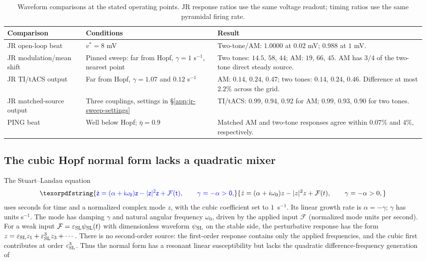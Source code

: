 \documentclass[11pt,a4paper]{article}
\newif\ifsupp
\providecommand{\DIFaddtex}[1]{{\protect\color{blue} \sf #1}} %
\providecommand{\DIFadd}[1]{\texorpdfstring{\DIFaddtex{#1}}{#1}} %
\begin{document}
\begin{table}[htbp]
\color{blue}\centering\small
\caption{\color{blue}Waveform comparisons at the stated operating points. JR response ratios
use the same voltage readout; timing ratios use the same pyramidal firing rate.}
\label{tab:waveform-checks}
\begin{tabular}{@{}p{4.3cm}p{4.5cm}p{6cm}@{}}
\toprule
Comparison & Conditions & Result\\
\midrule
JR open-loop beat & $v^*=8$ mV & Two-tone/AM: $1.0000$ at $0.02$ mV; $0.988$ at $1$ mV.\\
JR modulation/mean shift & Pinned sweep: far from Hopf, $\gamma=1$ s$^{-1}$, nearest point & Two tones: $14.5$, $58$, $44$; AM: $19$, $66$, $45$. AM has $3/4$ of the two-tone direct steady source.\\
JR TI/tACS output & Far from Hopf, $\gamma=1.07$ and $0.12$ s$^{-1}$ & AM: $0.14$, $0.24$, $0.47$; two tones: $0.14$, $0.24$, $0.46$. Difference at most $2.2\%$ across the grid.\\
JR matched-source output & Three couplings, settings in \S\ref{app:jr-sweep-settings} & TI/tACS: $0.99$, $0.94$, $0.92$ for AM; $0.99$, $0.93$, $0.90$ for two tones.\\
PING beat & Well below Hopf; $\bar\eta=0.9$ & Matched AM and two-tone responses agree within $0.07\%$ and $4\%$, respectively.\\
\bottomrule
\end{tabular}
\end{table}

\subsection{\DIFadd{The cubic Hopf normal form lacks a quadratic mixer}}\label{app:sl}
\DIFadd{The Stuart--Landau equation \cite{pikovsky2001}
}\begin{equation}
\DIFadd{\dot z=(\alpha+i\omega_0)z-|z|^2z+\mathcal F(t),\qquad
\gamma=-\alpha>0,
\label{eq:sl}
}\end{equation}
\DIFadd{uses seconds for time and a normalized complex mode $z$, with the cubic
coefficient set to $1$~s$^{-1}$. Its linear growth rate is $\alpha=-\gamma$;
$\gamma$ has units s$^{-1}$. The mode has damping $\gamma$ and natural angular frequency
$\omega_0$, driven by the applied input $\mathcal F$ (normalized mode units per second). For a weak input
$\mathcal F=\varepsilon_{\rm SL} \psi_{\rm SL}(t)$ with dimensionless waveform $\psi_{\rm SL}$ on the stable side, the perturbative response has
the form $z=\varepsilon_{\rm SL} z_1+\varepsilon_{\rm SL}^3z_3+\cdots$. There is no second-order
source: the first-order response contains only the applied frequencies, and the
cubic first contributes at order $\varepsilon_{\rm SL}^3$. Thus the normal form has a
resonant linear susceptibility but lacks the quadratic difference-frequency
generation of }\ifsupp \DIFadd{main-text}\fi{}
\end{document}

